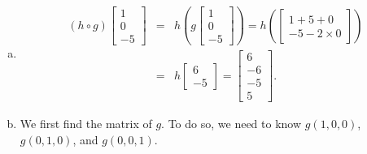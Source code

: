 \begin{enumerate}[a)]
	\item
\begin{eqnarray}
  (h\circ g)\left[\begin{array}{c}1\\0\\-5\end{array}\right] &=&
	h\left(g\left[\begin{array}{c}1\\0\\-5\end{array}\right] \right) =
	h\left(\left[\begin{array}{c}1+5+0\\-5-2\times0\end{array}\right] \right)\\
	&=& h\left[\begin{array}{c}6\\-5\end{array}\right] =
	\left[\begin{array}{c}6\\-6\\-5\\5\end{array}\right].
\end{eqnarray}
\item We first find the matrix of $g$. To do so, we need to know $g(1,0,0)$, $g(0,1,0)$, and $g(0,0,1)$.


\end{enumerate}
